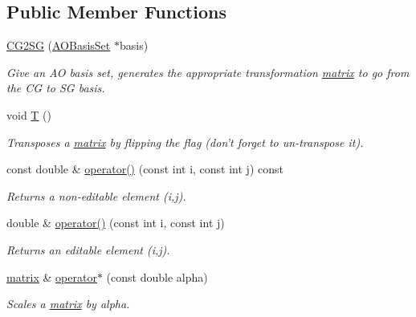 \subsection*{Public Member Functions}
\begin{DoxyCompactItemize}
\item 
\hyperlink{classJKBuilder_1_1CG2SG_a3dd17ea7b07cd7d20b0c21010b56eb04}{CG2SG} (\hyperlink{classJKBuilder_1_1AOBasisSet}{AOBasisSet} $\ast$basis)
\begin{DoxyCompactList}\small\item\em Give an AO basis set, generates the appropriate transformation \hyperlink{classJKBuilder_1_1matrix}{matrix} to go from the CG to SG basis. \item\end{DoxyCompactList}\item 
void \hyperlink{classJKBuilder_1_1matrix_af2563817f6505e9f8a6ee5c5c209a115}{T} ()
\begin{DoxyCompactList}\small\item\em Transposes a \hyperlink{classJKBuilder_1_1matrix}{matrix} by flipping the flag (don't forget to un-\/transpose it). \item\end{DoxyCompactList}\item 
const double \& \hyperlink{classJKBuilder_1_1matrix_a9ccbac42f4eefb704f04886001f4fb3e}{operator()} (const int i, const int j) const 
\begin{DoxyCompactList}\small\item\em Returns a non-\/editable element (i,j). \item\end{DoxyCompactList}\item 
double \& \hyperlink{classJKBuilder_1_1matrix_a3d7fca183ff1c9f4c160218746f2ef31}{operator()} (const int i, const int j)
\begin{DoxyCompactList}\small\item\em Returns an editable element (i,j). \item\end{DoxyCompactList}\item 
\hyperlink{classJKBuilder_1_1matrix}{matrix} \& \hyperlink{classJKBuilder_1_1matrix_ad4799cbe4a5d07c77f41857a3ce914a2}{operator$\ast$} (const double alpha)
\begin{DoxyCompactList}\small\item\em Scales a \hyperlink{classJKBuilder_1_1matrix}{matrix} by alpha. \item\end{DoxyCompactList}\item 

\end{DoxyCompactItemize}
